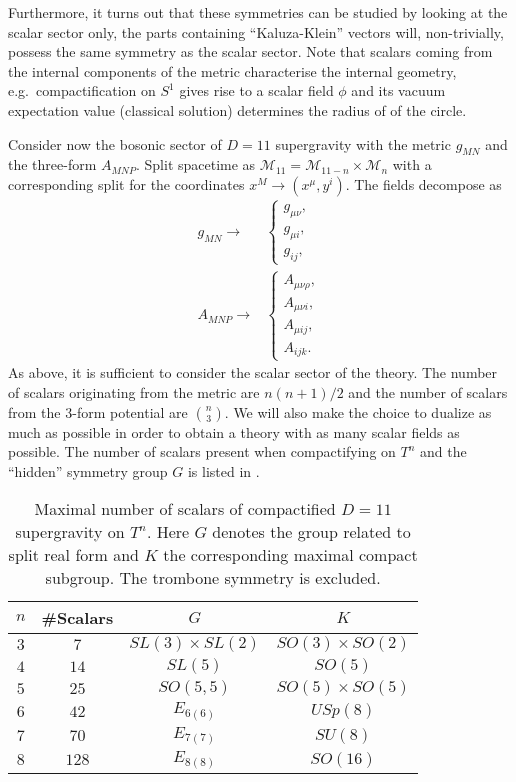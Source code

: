Furthermore, it turns out that these symmetries can be studied by looking at the scalar sector only, the parts containing ``Kaluza-Klein'' vectors will, non-trivially, possess the same symmetry as the scalar sector. Note that scalars coming from the internal components of the metric characterise the internal geometry, e.g.\ compactification on $S^1$ gives rise to a scalar field $\phi$ and its vacuum expectation value (classical solution) determines the radius of of the circle. 

Consider now the bosonic sector of $D=11$ supergravity with the metric $g_{MN}$ and the three-form $A_{MNP}$. Split spacetime as $\mathcal{M}_{11}=\mathcal{M}_{11-n}\times\mathcal{M}_n$ with a corresponding split for the coordinates $x^M\to (x^\mu,y^i)$. The fields decompose as 
\begin{align}
        g_{MN}\to &\begin{cases}g_{\mu\nu},\\g_{\mu i},\\g_{ij},\end{cases}\\
        A_{MNP}\to &\begin{cases}A_{\mu\nu\rho},\\A_{\mu\nu i},\\A_{\mu ij},\\A_{ijk}.\end{cases}
\end{align}
As above, it is sufficient to consider the scalar sector of the theory. The number of scalars originating from the metric are $n(n+1)/2$ and the number of scalars from the $3$-form potential are ${n}\choose{3}$. We will also make the choice to dualize as much as possible in order to obtain a theory with as many scalar fields as possible. The number of scalars present when compactifying on $T^n$ and the ``hidden'' symmetry group $G$ is listed in .

\begin{table}[]
    \centering
    \caption{Maximal number of scalars of compactified $D=11$ supergravity on $T^n$. Here $G$ denotes the group related to split real form and $K$ the corresponding maximal compact subgroup. The trombone symmetry is excluded.}
    \label{tab:Scalar}
    \begin{tabular}{|c|c|c|c|}\hline
         $n$ & \#Scalars & $G$ & $K$ \\\hline
         $3$ & $7$ & $SL(3)\times SL(2)$ & $SO(3)\times SO(2)$\\\hline
         $4$ & $14$ & $SL(5)$ & $SO(5)$ \\\hline
         $5$ & $25$ & $SO(5,5)$ & $SO(5)\times SO(5)$ \\\hline
         $6$ & $42$ & $E_{6(6)}$ & $USp(8)$ \\\hline
         $7$ & $70$ & $E_{7(7)}$ & $SU(8)$ \\\hline
         $8$ & $128$ & $E_{8(8)}$ & $SO(16)$ \\\hline
    \end{tabular}
\end{table}

